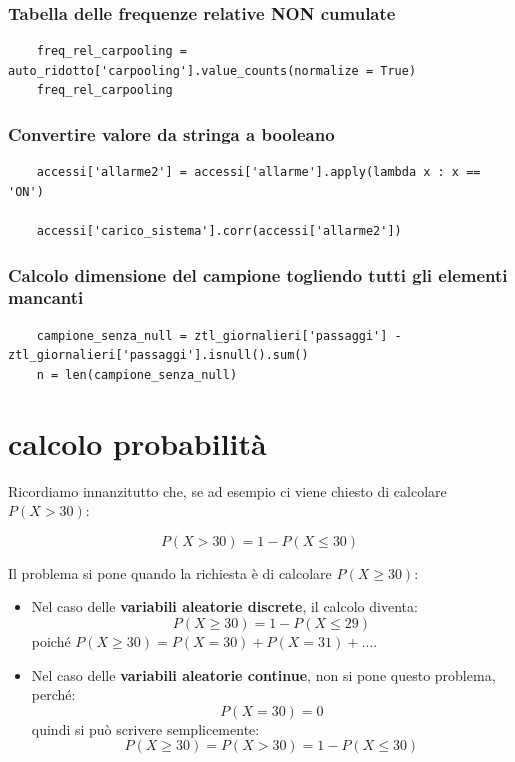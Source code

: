 \documentclass{article}
\begin{document}
\subsubsection*{Tabella delle frequenze relative NON cumulate}

\begin{lstlisting}
    freq_rel_carpooling = auto_ridotto['carpooling'].value_counts(normalize = True)
    freq_rel_carpooling
\end{lstlisting}

\subsubsection*{Convertire valore da stringa a booleano}

\begin{lstlisting}
    accessi['allarme2'] = accessi['allarme'].apply(lambda x : x == 'ON')

    accessi['carico_sistema'].corr(accessi['allarme2'])
\end{lstlisting}

\subsubsection*{Calcolo dimensione del campione togliendo tutti gli elementi mancanti}

\begin{lstlisting}
    campione_senza_null = ztl_giornalieri['passaggi'] - ztl_giornalieri['passaggi'].isnull().sum()
    n = len(campione_senza_null)
\end{lstlisting}

\pagebreak

\section{calcolo probabilità}

Ricordiamo innanzitutto che, se ad esempio ci viene chiesto di calcolare $P(X > 30)$:

\[
P(X > 30) = 1 - P(X \leq 30)
\]

Il problema si pone quando la richiesta è di calcolare $P(X \geq 30)$:

\begin{itemize}
  \item Nel caso delle \textbf{variabili aleatorie discrete}, il calcolo diventa:
  \[
  P(X \geq 30) = 1 - P(X \leq 29)
  \]
  poiché $P(X \geq 30) = P(X = 30) + P(X = 31) + \dots$.

  \item Nel caso delle \textbf{variabili aleatorie continue}, non si pone questo problema, perché:
  \[
  P(X = 30) = 0
  \]
  quindi si può scrivere semplicemente:
  \[
  P(X \geq 30) = P(X > 30) = 1 - P(X \leq 30)
  \]
\end{itemize}
\end{document}
